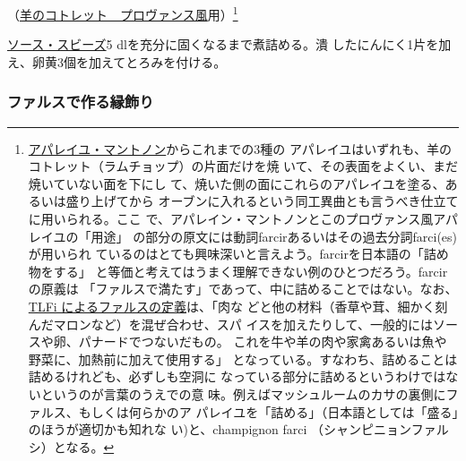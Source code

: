 \begin{recette}


（\protect\hyperlink{cotelettes-provencale}{羊のコトレット　プロヴァンス風}用）\footnote{\protect\hyperlink{appareil-maintenon}{アパレイユ・マントノン}からこれまでの3種の
  アパレイユはいずれも、羊のコトレット（ラムチョップ）の片面だけを焼
  いて、その表面をよくい、まだ焼いていない面を下にし
  て、焼いた側の面にこれらのアパレイユを塗る、あるいは盛り上げてから
  オーブンに入れるという同工異曲とも言うべき仕立てに用いられる。ここ
  で、アパレイン・マントノンとこのプロヴァンス風アパレイユの「用途」
  の部分の原文には動詞farcirあるいはその過去分詞farci(es)が用いられ
  ているのはとても興味深いと言えよう。farcirを日本語の「詰め物をする」
  と等価と考えてはうまく理解できない例のひとつだろう。farcirの原義は
  「ファルスで満たす」であって、中に詰めることではない。なお、\href{http://cnrtl.fr/definition/farce}{TLFi
  によるファルスの定義}は、「肉な
  どと他の材料（香草や茸、細かく刻んだマロンなど）を混ぜ合わせ、スパ
  イスを加えたりして、一般的にはソースや卵、パナードでつないだもの。
  これを牛や羊の肉や家禽あるいは魚や野菜に、加熱前に加えて使用する」
  となっている。すなわち、詰めることは詰めるけれども、必ずしも空洞に
  なっている部分に詰めるというわけではないというのが言葉のうえでの意
  味。例えばマッシュルームのカサの裏側にファルス、もしくは何らかのア
  パレイユを「詰める」（日本語としては「盛る」のほうが適切かも知れな
  い)と、champignon farci （シャンピニョンファルシ）となる。}

\protect\hyperlink{sauce-soubise}{ソース・スビーズ}5
dlを充分に固くなるまで煮詰める。潰
したにんにく1片を加え、卵黄3個を加えてとろみを付ける。

\hypertarget{bordures-en-farce}{%
\subsubsection{ファルスで作る縁飾り}\label{bordures-en-farce}}




\end{recette}
